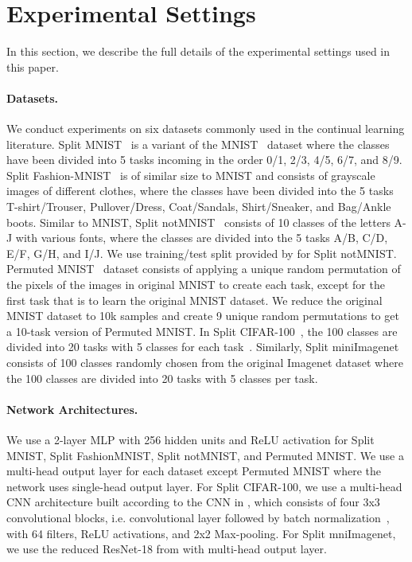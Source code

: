 
\section{Experimental Settings}\label{app:experimental_settings}

In this section, we describe the full details of the experimental settings used in this paper. 

\vspace{-2mm}
\paragraph{Datasets.}
We conduct experiments on six datasets commonly used in the continual learning literature. Split MNIST~ is a variant of the MNIST~ dataset where the classes have been divided into 5 tasks incoming in the order 0/1, 2/3, 4/5, 6/7, and 8/9. Split Fashion-MNIST~ is of similar size to MNIST and consists of grayscale images of different clothes, where the classes have been divided into the 5 tasks T-shirt/Trouser, Pullover/Dress, Coat/Sandals, Shirt/Sneaker, and Bag/Ankle boots. Similar to MNIST, Split notMNIST~ consists of 10 classes of the letters A-J with various fonts, where the classes are divided into the 5 tasks A/B, C/D, E/F, G/H, and I/J. We use training/test split provided by  for Split notMNIST. Permuted MNIST~ dataset consists of applying a unique random permutation of the pixels of the images in original MNIST to create each task, except for the first task that is to learn the original MNIST dataset. We reduce the original MNIST dataset to 10k samples and create 9 unique random permutations to get a 10-task version of Permuted MNIST. In Split CIFAR-100~, the 100 classes are divided into 20 tasks with 5 classes for each task~. Similarly, Split miniImagenet~ consists of 100 classes randomly chosen from the original Imagenet dataset where the 100 classes are divided into 20 tasks with 5 classes per task.

\vspace{-2mm}
\paragraph{Network Architectures.} We use a 2-layer MLP with 256 hidden units and ReLU activation for Split MNIST, Split FashionMNIST, Split notMNIST, and Permuted MNIST. We use a multi-head output layer for each dataset except Permuted MNIST where the network uses single-head output layer. For Split CIFAR-100, we use a multi-head CNN architecture built according to the CNN in , which consists of four 3x3 convolutional blocks, i.e. convolutional layer followed by batch normalization~, with 64 filters, ReLU activations, and 2x2 Max-pooling. For Split mniImagenet, we use the reduced ResNet-18 from  with multi-head output layer. 

